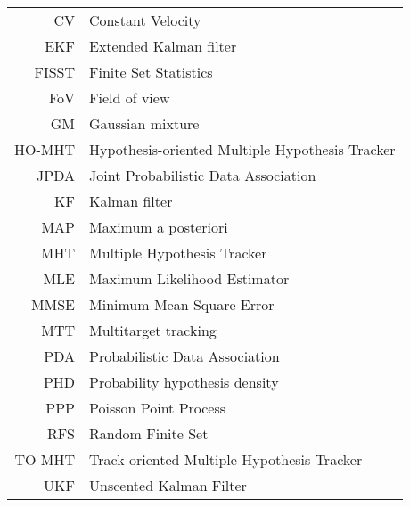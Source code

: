 \begin{tabular}{rl}
CV & Constant Velocity \\
EKF & Extended Kalman filter \\
FISST & Finite Set Statistics \\
FoV & Field of view \\
GM & Gaussian mixture \\
HO-MHT & Hypothesis-oriented Multiple Hypothesis Tracker \\
JPDA & Joint Probabilistic Data Association \\
KF & Kalman filter \\
MAP & Maximum a posteriori \\
MHT & Multiple Hypothesis Tracker \\
MLE & Maximum Likelihood Estimator \\
MMSE & Minimum Mean Square Error \\
MTT & Multitarget tracking \\
PDA & Probabilistic Data Association \\
PHD & Probability hypothesis density \\
PPP & Poisson Point Process \\
RFS & Random Finite Set \\
TO-MHT & Track-oriented Multiple Hypothesis Tracker \\
UKF & Unscented Kalman Filter \\
\end{tabular}
